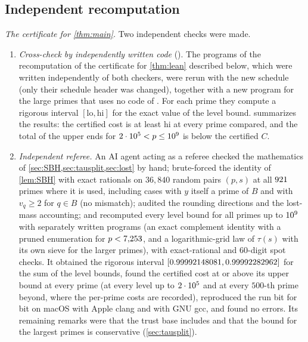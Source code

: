 \subsection{Independent recomputation}\label{sec:xcheck}

\emph{The certificate for \cref{thm:main}.} Two independent checks were made.
\begin{enumerate}[label=(\arabic*)]
\item \emph{Cross-check by independently written code} (). The programs of the
  recomputation of the certificate for \cref{thm:lean} described below, which were written independently of both
  checkers, were rerun with the new schedule (only their schedule header was changed), together with a new program
  for the large primes that uses no code of . For each prime they compute a rigorous interval
  $[\mathrm{lo},\mathrm{hi}]$ for the exact value of the level bound.  summarizes the results:
  the certified cost is at least $\mathrm{hi}$ at every prime compared, and the total of the upper ends for
  $2\cdot 10^{5}<p\le10^{9}$ is below the certified $C$.
\item \emph{Independent referee.} An AI agent acting as a referee checked the mathematics of
  \cref{sec:SBH,sec:tausplit,sec:lost} by hand; brute-forced the identity of \cref{lem:SBH} with exact rationals on
  $36{,}840$ random pairs $(p,s)$ at all $921$ primes where it is used, including cases with $y$ itself a
  prime of $B$ and with $v_q\ge2$ for $q\in B$ (no mismatch); audited the rounding directions and the lost-mass
  accounting; and recomputed every level bound for all primes up to $10^{9}$ with separately written programs (an
  exact complement identity with a pruned enumeration for $p<7{,}253$, and a logarithmic-grid law of $\tau(s)$ with
  its own sieve for the larger primes), with exact-rational and $60$-digit spot checks. It obtained the rigorous
  interval $[0.99992148081,0.99992282962]$ for the sum of the level bounds, found the certified cost at or above its upper
  bound at every prime (at every level up to $2\cdot 10^{5}$ and at every $500$-th prime beyond, where the per-prime costs are
  recorded), reproduced the run bit for bit on macOS with Apple clang and with GNU gcc, and found no errors. Its remaining
  remarks were that the trust base includes \cite[Theorem~6.1]{BBMST} and that the bound for the largest primes is
  conservative (\cref{sec:tausplit}).
\end{enumerate}

